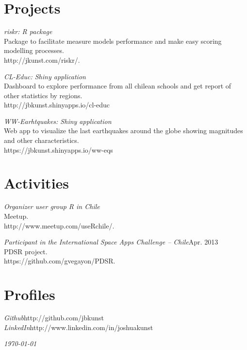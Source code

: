 \documentclass[margin]{res}
\begin{document}
\begin{resume}
\vspace{1cm}

\newpage

\section{Projects}
    
    {\sl riskr: R package}\\
    Package to facilitate measure models performance and make easy scoring modelling processes.\\
    http://jkunst.com/riskr/.
    
    {\sl CL-Educ: Shiny application}\\
    Dashboard to explore performance from all chilean schools and get report of other statistics by regions.\\
    http://jbkunst.shinyapps.io/cl-educ

    {\sl WW-Earhtquakes: Shiny application}\\
    Web app to visualize the last earthquakes around the globe showing magnitudes and other characteristics.\\
    https://jbkunst.shinyapps.io/ww-eqs

\vspace{1cm}


\section{Activities}
    
    {\sl Organizer user group R in Chile}\\
    Meetup.\\
    http://www.meetup.com/useRchile/.
    
    {\sl Participant in the International Space Apps Challenge – Chile}\hfill Apr. 2013\\
    PDSR project.\\
    https://github.com/gvegayon/PDSR.

\vspace{1cm}

\section{Profiles}
    
    {\sl Github}\hfill http://github.com/jbkunst\\
    
    {\sl LinkedIn}\hfill http://www.linkedin.com/in/joshuakunst

\vspace{1cm}


\end{resume}

\vspace{0.5cm}

\hfill {\sl \today}
\end{document}

